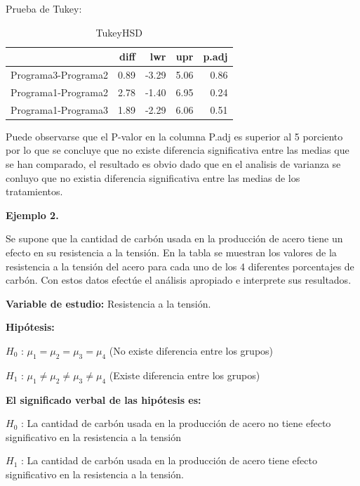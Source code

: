 \documentclass[12pt,letterpaper]{report}
\begin{document}
Prueba de Tukey: 
\begin{Schunk}
\end{Schunk}

\begin{table}[ht]
\centering
\begin{tabular}{rrrrr}
  \hline
 & diff & lwr & upr & p.adj \\ 
  \hline
Programa3-Programa2 & 0.89 & -3.29 & 5.06 & 0.86 \\ 
  Programa1-Programa2 & 2.78 & -1.40 & 6.95 & 0.24 \\ 
  Programa1-Programa3 & 1.89 & -2.29 & 6.06 & 0.51 \\ 
   \hline
\end{tabular}
\caption{TukeyHSD}
\end{table}

Puede observarse que el P-valor en la columna P.adj es superior al 5 porciento por lo que se concluye que no existe diferencia significativa entre las medias que se han comparado, el resultado es obvio dado que en el analisis de varianza se conluyo que no existia diferencia significativa entre las medias de los tratamientos.

\textbf{Ejemplo 2.}

Se supone que la cantidad de carbón usada en la producción de acero tiene un efecto en su
resistencia a la tensión. En la tabla se muestran los valores de la resistencia a la tensión del
acero para cada uno de los 4 diferentes porcentajes de carbón. Con estos datos efectúe el
análisis apropiado e interprete sus resultados.

\textbf{Variable de estudio:} Resistencia a la tensión.

\textbf{Hipótesis:}

$H_{0}$ : $\mu_1 = \mu_2 = \mu_3 = \mu_4$ (No existe diferencia entre los grupos)

$H_{1}$ : $\mu_1 \not= \mu_2 \not= \mu_3 \not= \mu_4$ (Existe diferencia entre los grupos)

\textbf{El significado verbal de las hipótesis es:}

\textbf{$H_{0}$} : La cantidad de carbón usada en la producción de acero no tiene efecto significativo en la resistencia a la tensión

\textbf{$H_{1}$} : La cantidad de carbón usada en la producción de acero tiene efecto significativo en la resistencia a la tensión.
\end{document}
